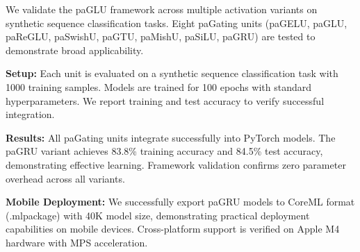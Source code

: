 We validate the paGLU framework across multiple activation variants on synthetic sequence classification tasks. Eight paGating units (paGELU, paGLU, paReGLU, paSwishU, paGTU, paMishU, paSiLU, paGRU) are tested to demonstrate broad applicability.

\textbf{Setup:} Each unit is evaluated on a synthetic sequence classification task with 1000 training samples. Models are trained for 100 epochs with standard hyperparameters. We report training and test accuracy to verify successful integration.

\textbf{Results:} All paGating units integrate successfully into PyTorch models. The paGRU variant achieves 83.8\% training accuracy and 84.5\% test accuracy, demonstrating effective learning. Framework validation confirms zero parameter overhead across all variants.

\textbf{Mobile Deployment:} We successfully export paGRU models to CoreML format (.mlpackage) with 40K model size, demonstrating practical deployment capabilities on mobile devices. Cross-platform support is verified on Apple M4 hardware with MPS acceleration. 